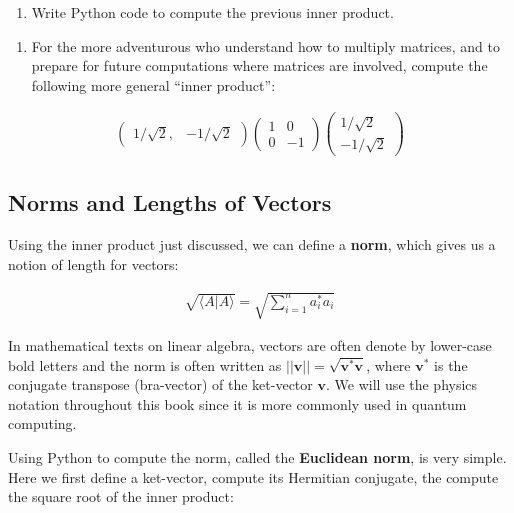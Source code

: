 \documentclass[11pt]{article}
\providecommand{\tightlist}{%
      \setlength{\itemsep}{0pt}\setlength{\parskip}{0pt}}
\begin{document}
    \begin{enumerate}
\def\labelenumi{\arabic{enumi}.}
\setcounter{enumi}{5}
\tightlist
\item
  Write Python code to compute the previous inner product.
\end{enumerate}

    \begin{enumerate}
\def\labelenumi{\arabic{enumi}.}
\setcounter{enumi}{6}
\tightlist
\item
  For the more adventurous who understand how to multiply matrices, and
  to prepare for future computations where matrices are involved,
  compute the following more general ``inner product'':
\end{enumerate}

\begin{align}
\begin{pmatrix}1/\sqrt{2}, & -1/\sqrt{2} \end{pmatrix}
\begin{pmatrix} 1&0\\0&-1 \end{pmatrix}
\begin{pmatrix}1/\sqrt{2}\\ -1/\sqrt{2} \end{pmatrix}
\end{align}

    \hypertarget{norms-and-lengths-of-vectors}{%
\subsection{Norms and Lengths of
Vectors}\label{norms-and-lengths-of-vectors}}

Using the inner product just discussed, we can define a \textbf{norm},
which gives us a notion of length for vectors:

\begin{align}
\sqrt{\langle A|A \rangle} = \sqrt{\sum_{i=1}^n a_i^*a_i}
\end{align}

In mathematical texts on linear algebra, vectors are often denote by
lower-case bold letters and the norm is often written as
\(||\mathbf{v}|| = \sqrt{\mathbf{v}^*\mathbf{v}}\), where
\(\mathbf{v}^*\) is the conjugate transpose (bra-vector) of the
ket-vector \(\mathbf{v}\). We will use the physics notation throughout
this book since it is more commonly used in quantum computing.

    Using Python to compute the norm, called the \textbf{Euclidean norm}, is
very simple. Here we first define a ket-vector, compute its Hermitian
conjugate, the compute the square root of the inner product:
\end{document}
